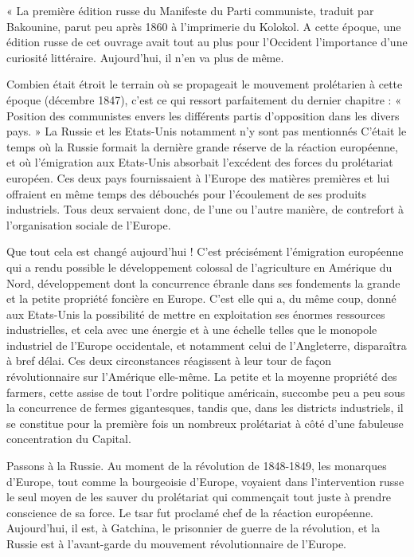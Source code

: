 \documentclass[french,twoside]{book} %
\newenvironment{quoteblock}%
  {\begin{quoting}}
  {\end{quoting}}
\newenvironment{quotebar}{%
    \def\FrameCommand{{\color{rubric!10!}\vrule width 0.5em} \hspace{0.9em}}%
    \def\OuterFrameSep{\itemsep} %
    \MakeFramed {\advance\hsize-\width \FrameRestore}
  }%
  {%
    \endMakeFramed
  }
\renewenvironment{quoteblock}%
  {%
    \savenotes
    \setstretch{0.9}
    \begin{quotebar}
  }
  {%
    \end{quotebar}
    \spewnotes
  }
\begin{document}
\begin{quoteblock}
\noindent « La première édition russe du Manifeste du Parti communiste, traduit par Bakounine, parut peu après 1860 à l’imprimerie du Kolokol. A cette époque, une édition russe de cet ouvrage avait tout au plus pour l’Occident l’importance d’une curiosité littéraire. Aujourd’hui, il n’en va plus de même.\par
Combien était étroit le terrain où se propageait le mouvement prolétarien à cette époque (décembre 1847), c’est ce qui ressort parfaitement du dernier chapitre : « Position des communistes envers les différents partis d’opposition dans les divers pays. » La Russie et les Etats-Unis notamment n’y sont pas mentionnés C’était le temps où la Russie formait la dernière grande réserve de la réaction européenne, et où l’émigration aux Etats-Unis absorbait l’excédent des forces du prolétariat européen. Ces deux pays fournissaient à l’Europe des matières premières et lui offraient en même temps des débouchés pour l’écoulement de ses produits industriels. Tous deux servaient donc, de l’une ou l’autre manière, de contrefort à l’organisation sociale de l’Europe.\par
Que tout cela est changé aujourd’hui ! C'est précisément l’émigration européenne qui a rendu possible le développement colossal de l’agriculture en Amérique du Nord, développement dont la concurrence ébranle dans ses fondements la grande et la petite propriété foncière en Europe. C'est elle qui a, du même coup, donné aux Etats-Unis la possibilité de mettre en exploitation ses énormes ressources industrielles, et cela avec une énergie et à une échelle telles que le monopole industriel de l’Europe occidentale, et notamment celui de l’Angleterre, disparaîtra à bref délai. Ces deux circonstances réagissent à leur tour de façon révolutionnaire sur l’Amérique elle-même. La petite et la moyenne propriété des farmers, cette assise de tout l’ordre politique américain, succombe peu a peu sous la concurrence de fermes gigantesques, tandis que, dans les districts industriels, il se constitue pour la première fois un nombreux prolétariat à côté d’une fabuleuse concentration du Capital.\par
Passons à la Russie. Au moment de la révolution de 1848-1849, les monarques d’Europe, tout comme la bourgeoisie d’Europe, voyaient dans l’intervention russe le seul moyen de les sauver du prolétariat qui commençait tout juste à prendre conscience de sa force. Le tsar fut proclamé chef de la réaction européenne. Aujourd’hui, il est, à Gatchina, le prisonnier de guerre de la révolution, et la Russie est à l’avant-garde du mouvement révolutionnaire de l’Europe.\par

\end{quoteblock}
\end{document}

